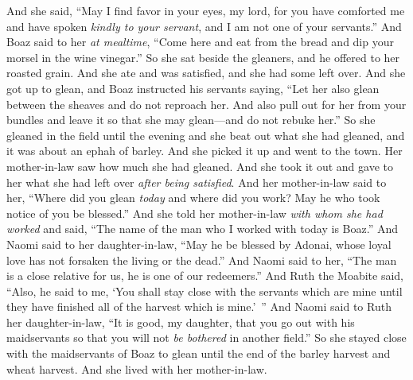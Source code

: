 \begin{biblechapter}
\verse And she said, “May I find favor in your eyes, my lord, for you have comforted me and have spoken \textit{kindly to your servant}, and I am not one of your servants.”
\verse And Boaz said to her \textit{at mealtime}, “Come here and eat from the bread and dip your morsel in the wine vinegar.” So she sat beside the gleaners, and he offered to her roasted grain. And she ate and was satisfied, and she had some left over.
\verse And she got up to glean, and Boaz instructed his servants saying, “Let her also glean between the sheaves and do not reproach her.
\verse And also pull out for her from your bundles and leave it so that she may glean—and do not rebuke her.”
\verse So she gleaned in the field until the evening and she beat out what she had gleaned, and it was about an ephah of barley.
\verse And she picked it up and went to the town. Her mother-in-law saw how much she had gleaned. And she took it out and gave to her what she had left over \textit{after being satisfied}.
\verse And her mother-in-law said to her, “Where did you glean \textit{today} and where did you work? May he who took notice of you be blessed.” And she told her mother-in-law \textit{with whom she had worked} and said, “The name of the man who I worked with today is Boaz.”
\verse And Naomi said to her daughter-in-law, “May he be blessed by Adonai, whose loyal love has not forsaken the living or the dead.” And Naomi said to her, “The man is a close relative for us, he is one of our redeemers.”
\verse And Ruth the Moabite said, “Also, he said to me, ‘You shall stay close with the servants which are mine until they have finished all of the harvest which is mine.’ ”
\verse And Naomi said to Ruth her daughter-in-law, “It is good, my daughter, that you go out with his maidservants so that you will not \textit{be bothered} in another field.”
\verse So she stayed close with the maidservants of Boaz to glean until the end of the barley harvest and wheat harvest. And she lived with her mother-in-law.
\end{biblechapter}

